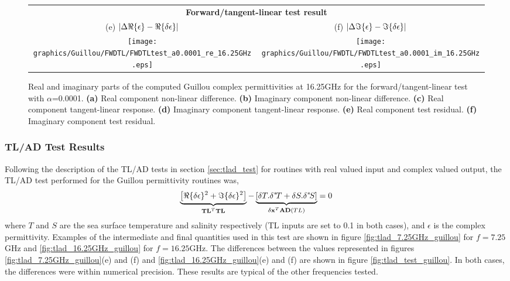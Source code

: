 \begin{figure}[htp]
\begin{tabular}{c c}
    \multicolumn{2}{c}{\sffamily\textbf{Forward/tangent-linear test result}}\\
    \textsf{(e)} $|\Delta\Re\{\epsilon\} - \Re\{\delta\epsilon\}|$ &
    \textsf{(f)} $|\Delta\Im\{\epsilon\} - \Im\{\delta\epsilon\}|$ \\
    \texttt{[image: graphics/Guillou/FWDTL/FWDTLtest\_a0.0001\_re\_16.25GHz.eps]} & 
    \texttt{[image: graphics/Guillou/FWDTL/FWDTLtest\_a0.0001\_im\_16.25GHz.eps]}
  \end{tabular}
  \caption{Real and imaginary parts of the computed Guillou complex permittivities at 16.25GHz for the forward/tangent-linear test with $\alpha$=0.0001. \textbf{(a)} Real component non-linear difference.  \textbf{(b)} Imaginary component non-linear difference. \textbf{(c)} Real component tangent-linear response. \textbf{(d)} Imaginary component tangent-linear response. \textbf{(e)} Real component test residual. \textbf{(f)} Imaginary component test residual.}
  \label{fig:fwdtl_a0.0001_guillou}
\end{figure}


\subsubsection{TL/AD Test Results}
\label{sec:tlad_guillou}
Following the description of the TL/AD tests in section \ref{sec:tlad_test} for routines with real valued input and complex valued output, the TL/AD test performed for the Guillou permittivity routines was,
\begin{equation}
  \underbrace{\left[\Re\{\delta\epsilon\}^{2} + \Im\{\delta\epsilon\}^{2}\right]}_{\mathbf{TL}^{T}\mathbf{TL}} - \underbrace{\left[\delta{T}.\delta^{*}\! {T} + \delta{S}.\delta^{*}\! {S}\right]}_{\mathbf{\delta x}^{T}\mathbf{AD}(TL)} = 0
  \label{eqn:tlad_guillou}
\end{equation}
where $T$ and $S$ are the sea surface temperature and salinity respectively (TL inputs are set to 0.1 in both cases), and $\epsilon$ is the complex permittivity. Examples of the intermediate and final quantities used in this test are shown in figure \ref{fig:tlad_7.25GHz_guillou} for $f = 7.25$GHz and \ref{fig:tlad_16.25GHz_guillou} for $f = 16.25$GHz. The differences between the values represented in figures \ref{fig:tlad_7.25GHz_guillou}(e) and (f) and \ref{fig:tlad_16.25GHz_guillou}(e) and (f) are shown in figure \ref{fig:tlad_test_guillou}. In both cases, the differences were within numerical precision. These results are typical of the other frequencies tested.


